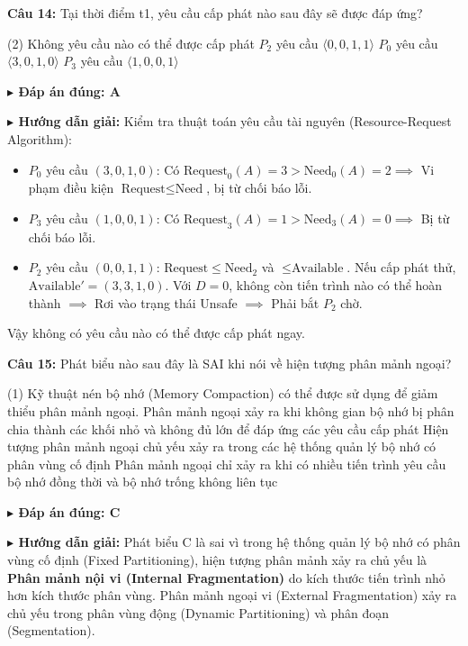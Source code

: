 \documentclass[11pt,a4paper]{article}
\newcommand{\giaithich}[2]{%
    \par\vspace{0.15cm}\noindent
    \begingroup\small
    \noindent\textbf{\color{blue}$\blacktriangleright$ Đáp án đúng: #1} \par\vspace{0.08cm}
    \noindent\textbf{\color{teal}$\blacktriangleright$ Hướng dẫn giải:} #2
    \endgroup\par\vspace{0.35cm}
}
\begin{document}
\noindent\textbf{Câu 14:} Tại thời điểm t1, yêu cầu cấp phát nào sau đây sẽ được đáp ứng?
\begin{tasks}(2)
    \task Không yêu cầu nào có thể được cấp phát
    \task $P_2$ yêu cầu $\langle 0, 0, 1, 1 \rangle$
    \task $P_0$ yêu cầu $\langle 3, 0, 1, 0 \rangle$
    \task $P_3$ yêu cầu $\langle 1, 0, 0, 1 \rangle$
\end{tasks}
\giaithich{A}{Kiểm tra thuật toán yêu cầu tài nguyên (Resource-Request Algorithm):
\begin{itemize}[noitemsep,topsep=1pt]
    \item $P_0$ yêu cầu $(3, 0, 1, 0)$: Có $\text{Request}_0(A) = 3 > \text{Need}_0(A) = 2 \implies$ Vi phạm điều kiện $\text{Request} \le \text{Need}$, bị từ chối báo lỗi.
    \item $P_3$ yêu cầu $(1, 0, 0, 1)$: Có $\text{Request}_3(A) = 1 > \text{Need}_3(A) = 0 \implies$ Bị từ chối báo lỗi.
    \item $P_2$ yêu cầu $(0, 0, 1, 1)$: $\text{Request} \le \text{Need}_2$ và $\le \text{Available}$. Nếu cấp phát thử, $\text{Available}' = (3, 3, 1, 0)$. Với $D=0$, không còn tiến trình nào có thể hoàn thành $\implies$ Rơi vào trạng thái Unsafe $\implies$ Phải bắt $P_2$ chờ.
\end{itemize}
Vậy không có yêu cầu nào có thể được cấp phát ngay.}

\noindent\textbf{Câu 15:} Phát biểu nào sau đây là SAI khi nói về hiện tượng phân mảnh ngoại?
\begin{tasks}(1)
    \task Kỹ thuật nén bộ nhớ (Memory Compaction) có thể được sử dụng để giảm thiểu phân mảnh ngoại.
    \task Phân mảnh ngoại xảy ra khi không gian bộ nhớ bị phân chia thành các khối nhỏ và không đủ lớn để đáp ứng các yêu cầu cấp phát
    \task Hiện tượng phân mảnh ngoại chủ yếu xảy ra trong các hệ thống quản lý bộ nhớ có phân vùng cố định
    \task Phân mảnh ngoại chỉ xảy ra khi có nhiều tiến trình yêu cầu bộ nhớ đồng thời và bộ nhớ trống không liên tục
\end{tasks}
\giaithich{C}{Phát biểu C là sai vì trong hệ thống quản lý bộ nhớ có phân vùng cố định (Fixed Partitioning), hiện tượng phân mảnh xảy ra chủ yếu là \textbf{Phân mảnh nội vi (Internal Fragmentation)} do kích thước tiến trình nhỏ hơn kích thước phân vùng. Phân mảnh ngoại vi (External Fragmentation) xảy ra chủ yếu trong phân vùng động (Dynamic Partitioning) và phân đoạn (Segmentation).}
\end{document}
